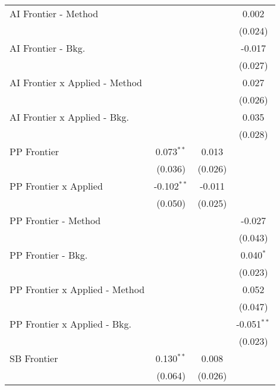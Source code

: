 \begin{tabular}{lccc}
   AI Frontier - Method           &               &              & 0.002\\   
                                  &               &              & (0.024)\\   
   AI Frontier - Bkg.             &               &              & -0.017\\   
                                  &               &              & (0.027)\\   
   AI Frontier x Applied - Method &               &              & 0.027\\   
                                  &               &              & (0.026)\\   
   AI Frontier x Applied - Bkg.   &               &              & 0.035\\   
                                  &               &              & (0.028)\\   
   PP Frontier                    & 0.073$^{**}$  & 0.013        &   \\   
                                  & (0.036)       & (0.026)      &   \\   
   PP Frontier x Applied          & -0.102$^{**}$ & -0.011       &   \\   
                                  & (0.050)       & (0.025)      &   \\   
   PP Frontier - Method           &               &              & -0.027\\   
                                  &               &              & (0.043)\\   
   PP Frontier - Bkg.             &               &              & 0.040$^{*}$\\   
                                  &               &              & (0.023)\\   
   PP Frontier x Applied - Method &               &              & 0.052\\   
                                  &               &              & (0.047)\\   
   PP Frontier x Applied - Bkg.   &               &              & -0.051$^{**}$\\   
                                  &               &              & (0.023)\\   
   SB Frontier                    & 0.130$^{**}$  & 0.008        &   \\   
                                  & (0.064)       & (0.026)      &   \\   

\end{tabular}
